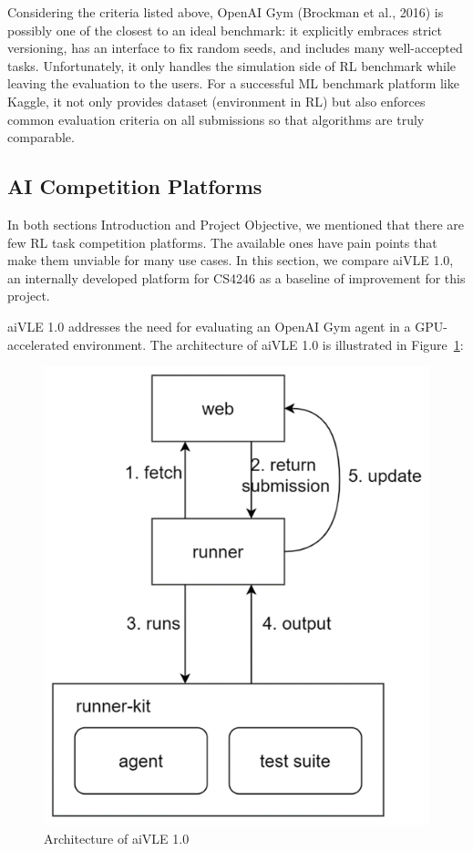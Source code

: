 Considering the criteria listed above, OpenAI Gym (Brockman et al., 2016) is possibly one of the closest to an ideal benchmark: it explicitly embraces strict versioning, has an interface to fix random seeds, and includes many well-accepted tasks. Unfortunately, it only handles the simulation side of RL benchmark while leaving the evaluation to the users. For a successful ML benchmark platform like Kaggle, it not only provides dataset (environment in RL) but also enforces common evaluation criteria on all submissions so that algorithms are truly comparable.

\subsection{AI Competition Platforms}
\label{ch:literature-review-related-work-ai-competition-platforms}
In both sections Introduction and Project Objective, we mentioned that there are few RL task competition platforms. The available ones have pain points that make them unviable for many use cases. In this section, we compare aiVLE 1.0, an internally developed platform for CS4246 as a baseline of improvement for this project.

aiVLE 1.0 addresses the need for evaluating an OpenAI Gym agent in a GPU-accelerated environment. The architecture of aiVLE 1.0 is illustrated in Figure~\ref{fig:aivle-1-arch}:

\begin{figure}[H]
    \centering
    \includegraphics{images/aivle_1_arch.png}
    \caption{Architecture of aiVLE 1.0}
    \label{fig:aivle-1-arch}
\end{figure}

